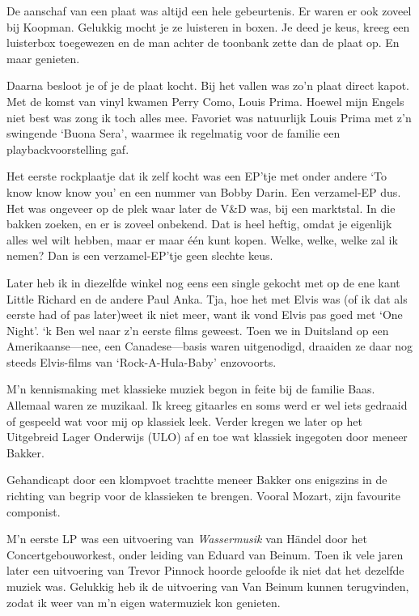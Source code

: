 \documentclass[10pt,twoside, openright]{memoir}
\begin{document}
De aanschaf van een plaat was altijd een hele gebeurtenis. Er waren er ook zoveel bij Koopman. Gelukkig mocht je ze luisteren in boxen. Je deed je keus, kreeg een luisterbox toegewezen en de man achter de toonbank zette dan de plaat op. En maar genieten. 

Daarna besloot je of je de plaat kocht. Bij het vallen was zo’n plaat direct kapot. Met de komst van vinyl kwamen Perry Como, Louis Prima. Hoewel mijn Engels niet best was zong ik toch alles mee. Favoriet was natuurlijk Louis Prima met z’n swingende `Buona Sera', waarmee ik regelmatig voor de familie een playbackvoorstelling gaf.


Het eerste rockplaatje dat ik zelf kocht was een EP'tje met onder andere `To know know know you' en een nummer van Bobby Darin. Een verzamel-EP dus. Het was ongeveer op de plek waar later de V\&D was, bij een marktstal. In die bakken zoeken, en er is zoveel onbekend. Dat is heel heftig, omdat je eigenlijk alles wel wilt hebben, maar er maar één kunt kopen. Welke, welke, welke zal ik nemen? Dan is een verzamel-EP'tje geen slechte keus.

Later heb ik in diezelfde winkel nog eens een single gekocht met op de ene kant Little Richard en de andere Paul Anka. Tja, hoe het met Elvis was (of ik dat als eerste had of pas later)weet ik niet meer, want ik vond Elvis pas goed met `One Night'. `k Ben wel naar z'n eerste films geweest. Toen we in Duitsland op een Amerikaanse---nee, een Canadese---basis waren uitgenodigd, draaiden ze daar nog steeds Elvis-films van `Rock-A-Hula-Baby' enzovoorts.

M’n kennismaking met klassieke muziek begon in feite bij de familie Baas. Allemaal waren ze muzikaal. Ik kreeg gitaarles en soms werd er wel iets gedraaid of gespeeld wat voor mij op klassiek leek. Verder kregen we later op het Uitgebreid Lager Onderwijs (ULO) af en toe wat klassiek ingegoten door meneer Bakker. 

Gehandicapt door een klompvoet trachtte meneer Bakker ons enigszins in de richting van begrip voor de klassieken te brengen. Vooral Mozart, zijn favourite componist.

M’n eerste LP was een uitvoering van \emph{Wassermusik} van Händel door het Concertgebouworkest, onder leiding van Eduard van Beinum. Toen ik vele jaren later een uitvoering van Trevor Pinnock hoorde geloofde ik niet dat het dezelfde muziek was. Gelukkig heb ik de uitvoering van Van Beinum kunnen terugvinden, zodat ik weer van m’n eigen watermuziek kon genieten. 
\end{document}
